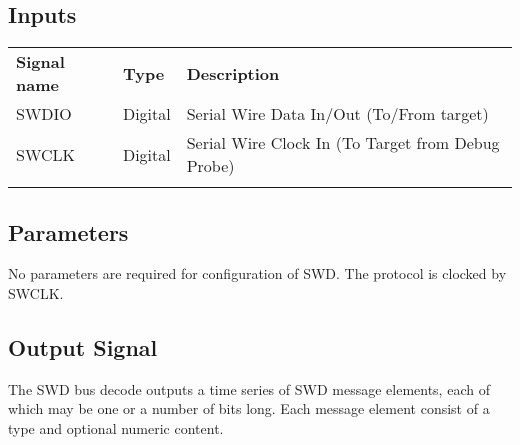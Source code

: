 \subsection{Inputs}

\begin{tabularx}{16cm}{llX}
\thickhline
\textbf{Signal name} & \textbf{Type} & \textbf{Description} \\
\thickhline
SWDIO & Digital & Serial Wire Data In/Out (To/From target)\\
SWCLK & Digital & Serial Wire Clock In (To Target from Debug Probe)\\
\thickhline
\end{tabularx}

\subsection{Parameters}

No parameters are required for configuration of SWD. The protocol is clocked by SWCLK.

\subsection{Output Signal}

The SWD bus decode outputs a time series of SWD message elements, each of which may be one or a number of bits long.
Each message element consist of a type and optional numeric content.

